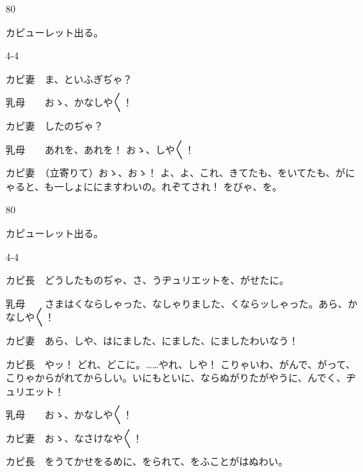 \documentclass[tate,paper=b6j,jafontsize=9pt]{jlreq}
\begin{document}
\begin{azconvIndented}{8\zw}{0\zw}

カピューレット出る。

\end{azconvIndented}
\begin{azconvIndented}{4\zw}{-4\zw}

カピ妻　ま、といふぎぢゃ？

乳母　　おゝ、かなしや{〳〵}！

カピ妻　したのぢゃ？

乳母　　あれを、あれを！ おゝ、しや{〳〵}！

カピ妻　（立寄りて）おゝ、おゝ！ よ、よ、これ、きてたも、をいてたも、がにゃると、も一しょににますわいの。れぞてされ！ をびゃ、を。

\end{azconvIndented}
\begin{azconvIndented}{8\zw}{0\zw}

カピューレット出る。

\end{azconvIndented}
\begin{azconvIndented}{4\zw}{-4\zw}

カピ長　どうしたものぢゃ、さ、うヂュリエットを、がせたに。

乳母　　さまはくならしゃった、なしゃりました、くならッしゃった。あら、かなしや{〳〵}！

カピ妻　あら、しや、はにました、にました、にましたわいなう！

カピ長　やッ！ どれ、どこに。……やれ、しや！ こりゃいわ、がんで、がって、こりゃからがれてからしい。いにもといに、ならぬがりたがやうに、んでく、ヂュリエット！

乳母　　おゝ、かなしや{〳〵}！

カピ妻　おゝ、なさけなや{〳〵}！

カピ長　をうてかせをるめに、をられて、をふことがはぬわい。

\end{azconvIndented}
\end{document}
